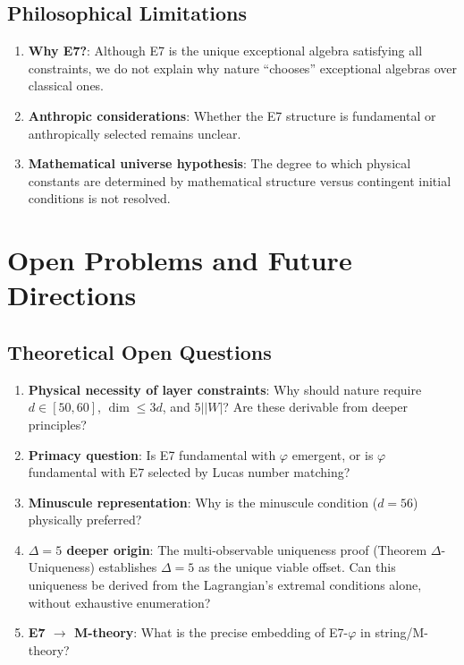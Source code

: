 \documentclass[11pt,a4paper]{article}
\begin{document}
\subsection{Philosophical Limitations}

\begin{enumerate}
\item \textbf{Why E7?}: Although E7 is the unique exceptional algebra satisfying all constraints, we do not explain why nature ``chooses'' exceptional algebras over classical ones.

\item \textbf{Anthropic considerations}: Whether the E7 structure is fundamental or anthropically selected remains unclear.

\item \textbf{Mathematical universe hypothesis}: The degree to which physical constants are determined by mathematical structure versus contingent initial conditions is not resolved.
\end{enumerate}

\section{Open Problems and Future Directions}

\subsection{Theoretical Open Questions}

\begin{enumerate}
\item \textbf{Physical necessity of layer constraints}: Why should nature require $d \in [50,60]$, $\dim \leq 3d$, and $5||W|$? Are these derivable from deeper principles?

\item \textbf{Primacy question}: Is E7 fundamental with $\varphi$ emergent, or is $\varphi$ fundamental with E7 selected by Lucas number matching?

\item \textbf{Minuscule representation}: Why is the minuscule condition ($d = 56$) physically preferred?

\item \textbf{$\Delta = 5$ deeper origin}: The multi-observable uniqueness proof (Theorem $\Delta$-Uniqueness) establishes $\Delta = 5$ as the unique viable offset. Can this uniqueness be derived from the Lagrangian's extremal conditions alone, without exhaustive enumeration?

\item \textbf{E7 $\to$ M-theory}: What is the precise embedding of E7-$\varphi$ in string/M-theory?
\end{enumerate}
\end{document}
